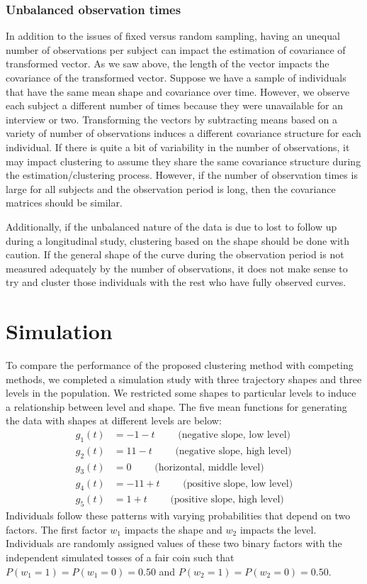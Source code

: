 \documentclass[12pt]{article}
\begin{document}
\subsubsection{Unbalanced observation times}
In addition to the issues of fixed versus random sampling, having an unequal number of observations per subject can impact the estimation of covariance of transformed vector. As we saw above, the length of the vector impacts the covariance of the transformed vector. Suppose we have a sample of individuals that have the same mean shape and covariance over time. However, we observe each subject a different number of times because they were unavailable for an interview or two. Transforming the vectors by subtracting means based on a variety of number of observations induces a different covariance structure for each individual. If there is quite a bit of variability in the number of observations, it may impact clustering to assume they share the same covariance structure during the estimation/clustering process. However, if the number of observation times is large for all subjects and the observation period is long, then the covariance matrices should be similar. 

Additionally, if the unbalanced nature of the data is due to lost to follow up during a longitudinal study, clustering based on the shape should be done with caution. If the general shape of the curve during the observation period is not measured adequately by the number of observations, it does not make sense to try and cluster those individuals with the rest who have fully observed curves. 

\section{Simulation}
To compare the performance of the proposed clustering method with competing methods, we completed a simulation study with three trajectory shapes and three levels in the population. We restricted some shapes to particular levels to induce a relationship between level and shape. The five mean functions for generating the data with shapes at different levels are below:   
\begin{align*}
g_{1}(t) &= -1 - t \quad\quad\text{ (negative slope, low level)}\\
g_{2}(t) &= 11 - t\quad\quad\text{ (negative slope, high level)}\\
g_{3}(t) &= 0\quad\quad\text{ (horizontal, middle level)}\\
g_{4}(t) &= -11 + t\quad\quad\text{ (positive slope, low level)}\\
g_{5}(t) &= 1 + t\quad\quad\text{ (positive slope, high level)}
\end{align*} 
Individuals follow these patterns with varying probabilities that depend on two factors. The first factor $w_{1}$ impacts the shape and $w_{2}$ impacts the level. Individuals are randomly assigned values of these two binary factors with the independent simulated tosses of a fair coin such that $P(w_{1}=1) = P(w_{1}=0) = 0.50$ and $P(w_{2}=1) = P(w_{2}=0)=0.50$. 
\end{document}

